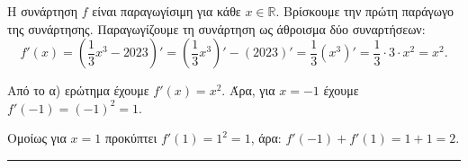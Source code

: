 \begin{alist}
\item Η συνάρτηση $f$ είναι παραγωγίσιμη για κάθε $x \in \mathbb{R}$. Βρίσκουμε την πρώτη παράγωγο της συνάρτησης. Παραγωγίζουμε τη συνάρτηση ως άθροισμα δύο συναρτήσεων:
\[ f'(x) = \left(\frac{1}{3}x^3 - 2023\right)' = \left(\frac{1}{3}x^3\right)' - (2023)' = \frac{1}{3}(x^3)' = \frac{1}{3} \cdot 3 \cdot x^2 = x^2. \]
\item Από το α) ερώτημα έχουμε $f'(x) = x^2$. Άρα, για $x=-1$ έχουμε $f'(-1) = (-1)^2 = 1$.
\item Ομοίως για $x=1$ προκύπτει $f'(1) = 1^2 = 1$, άρα: $f'(-1) + f'(1) = 1 + 1 = 2$.
\end{alist}
\vspace{6mm}
\noindent\rule{\textwidth}{0.4pt}
\vspace{6mm}

